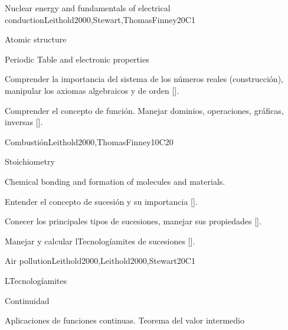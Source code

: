 \begin{syllabus}
\begin{unit}{}{Nuclear energy and fundamentals of electrical conduction}{Leithold2000,Stewart,ThomasFinney}{20}{C1}
   \begin{topics}
    \item Atomic structure
    \item Periodic Table and electronic properties
    \end{topics}

   \begin{learningoutcomes}
      \item Comprender la importancia del sistema de los números reales (construcción), manipular los axiomas algebraicos y de orden [\Assessment].
      \item Comprender el concepto de función. Manejar dominios, operaciones, gráficas, inversas [\Assessment].
      \end{learningoutcomes}
\end{unit}

\begin{unit}{}{Combustión}{Leithold2000,ThomasFinney}{10}{C20}
  
  \begin{topics}
    \item Stoichiometry
    \item Chemical bonding and formation of molecules and materials.   

  \end{topics}

   \begin{learningoutcomes}
      \item Entender el concepto de sucesión y su importancia [\Assessment].
      \item Conecer los principales tipos de sucesiones, manejar sus propiedades [\Assessment].
      \item Manejar y calcular lTecnologíamites de sucesiones [\Assessment].
      \end{learningoutcomes}
\end{unit}

\begin{unit}{}{Air pollution}{Leithold2000,Leithold2000,Stewart}{20}{C1}
   \begin{topics}
      \item LTecnologíamites
      \item Continuidad
      \item Aplicaciones de funciones continuas. Teorema del valor intermedio
    \end{topics}


\end{unit}
\end{syllabus}
